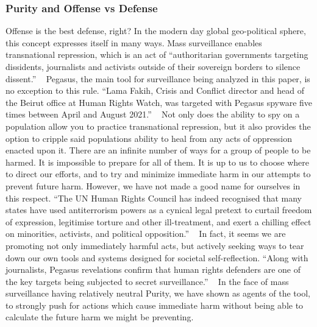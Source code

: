 \documentclass[sigconf]{acmart}
\begin{document}
\subsubsection{Purity and Offense vs Defense}
Offense is the best defense, right? In the modern day global geo-political sphere, this concept expresses itself in many ways. Mass surveillance enables transnational repression, which is an act of “authoritarian governments targeting dissidents, journalists and activists outside of their sovereign borders to silence dissent.” ~\cite{used_eighth(5)} Pegasus, the main tool for surveillance being analyzed in this paper, is no exception to this rule. “Lama Fakih, Crisis and Conflict director and head of the Beirut office at Human Rights Watch, was targeted with Pegasus spyware five times between April and August 2021.” ~\cite{used_tenth(11)} Not only does the ability to spy on a population allow you to practice transnational repression, but it also provides the option to cripple said populations ability to heal from any acts of oppression enacted upon it. There are an infinite number of ways for a group of people to be harmed. It is impossible to prepare for all of them. It is up to us to choose where to direct our efforts, and to try and minimize immediate harm in our attempts to prevent future harm. However, we have not made a good name for ourselves in this respect. “The UN Human Rights Council has indeed recognised that many states have used antiterrorism powers as a cynical legal pretext to curtail freedom of expression, legitimise torture and other ill-treatment, and exert a chilling effect on minorities, activists, and political opposition.” ~\cite{used_eleventh(12)} In fact, it seems we are promoting not only immediately harmful acts, but actively seeking ways to tear down our own tools and systems designed for societal self-reflection. “Along with journalists, Pegasus revelations confirm that human rights defenders are one of the key targets being subjected to secret surveillance.” ~\cite{used_twelfth(13)} In the face of mass surveillance having relatively neutral Purity, we have shown as agents of the tool, to strongly push for actions which cause immediate harm without being able to calculate the future harm we might be preventing.
\end{document}
